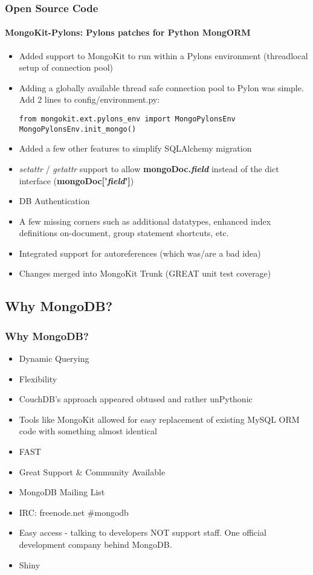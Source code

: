 \documentclass{beamer}
\begin{document}
\begin{frame}[fragile]
\frametitle{Open Source Code}
\framesubtitle{MongoKit-Pylons: Pylons patches for Python MongORM}
\begin{itemize}
	\item Added support to MongoKit to run within a Pylons environment (threadlocal setup of connection pool)
	\item<2-> Adding a globally available thread safe connection pool to Pylon was simple. Add 2 lines to config/environment.py:
\begin{lstlisting}
from mongokit.ext.pylons_env import MongoPylonsEnv
MongoPylonsEnv.init_mongo()	
\end{lstlisting}
	\item Added a few other features to simplify SQLAlchemy migration
	\item<4-> {\em setattr} / {\em getattr} support to allow {\bf mongoDoc.{\em field}} instead of the dict interface ({\bf mongoDoc['{\em field}']})
	\item<5-> DB Authentication
	\item<6-> A few missing corners such as additional datatypes, enhanced index definitions on-document, group statement shortcuts, etc.
	\item<7-> Integrated support for autoreferences (which was/are a bad idea)
	\item<8-> Changes merged into MongoKit Trunk (GREAT unit test coverage)
\end{itemize}
\end{frame}


\subsection[Why MongoDB?]{Why MongoDB?}

\begin{frame}
\frametitle{Why MongoDB?}
	\begin{itemize}
		\item Dynamic Querying
		\item Flexibility
		\item<2-> CouchDB's approach appeared obtused and rather unPythonic
		\item<3-> Tools like MongoKit allowed for easy replacement of existing MySQL ORM code with something almost identical
		\item FAST
		\item Great Support \& Community Available
		\item<4-> MongoDB Mailing List
		\item<5-> IRC: freenode.net \#mongodb
		\item<6-> Easy access - talking to developers NOT support staff. One official development company behind MongoDB.
		\item Shiny
	\end{itemize}
\end{frame}
\end{document}
